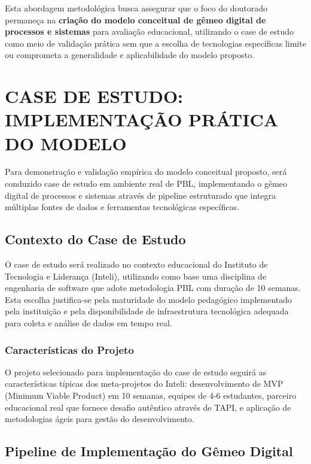 \documentclass[12pt, a4paper, oneside]{abntex2}
\begin{document}
Esta abordagem metodológica busca assegurar que o foco do doutorado permaneça na \textbf{criação do modelo conceitual de gêmeo digital de processos e sistemas} para avaliação educacional, utilizando o case de estudo como meio de validação prática sem que a escolha de tecnologias específicas limite ou comprometa a generalidade e aplicabilidade do modelo proposto.

\section{CASE DE ESTUDO: IMPLEMENTAÇÃO PRÁTICA DO MODELO}

Para demonstração e validação empírica do modelo conceitual proposto, será conduzido case de estudo em ambiente real de PBL, implementando o gêmeo digital de processos e sistemas através de pipeline estruturado que integra múltiplas fontes de dados e ferramentas tecnológicas específicas.

\subsection{Contexto do Case de Estudo}

O case de estudo será realizado no contexto educacional do Instituto de Tecnologia e Liderança (Inteli), utilizando como base uma disciplina de engenharia de software que adote metodologia PBL com duração de 10 semanas. Esta escolha justifica-se pela maturidade do modelo pedagógico implementado pela instituição \cite{inteli2024} e pela disponibilidade de infraestrutura tecnológica adequada para coleta e análise de dados em tempo real.

\subsubsection{Características do Projeto}

O projeto selecionado para implementação do case de estudo seguirá as características típicas dos meta-projetos do Inteli: desenvolvimento de MVP (Minimum Viable Product) em 10 semanas, equipes de 4-6 estudantes, parceiro educacional real que fornece desafio autêntico através de TAPI, e aplicação de metodologias ágeis para gestão do desenvolvimento.

\subsection{Pipeline de Implementação do Gêmeo Digital}
\end{document}
